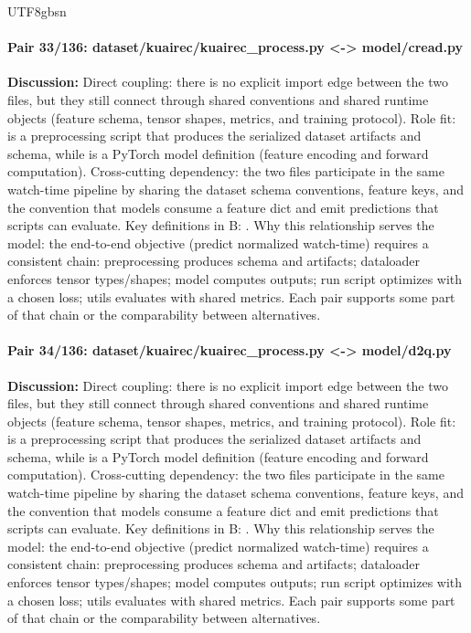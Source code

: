 \documentclass[11pt]{article}
\begin{document}
\begin{CJK*}{UTF8}{gbsn}
\paragraph{Pair 33/136: dataset/kuairec/kuairec\_process.py <-> model/cread.py}
\textbf{Discussion:} Direct coupling: there is no explicit import edge between the two files, but they still connect through shared conventions and shared runtime objects (feature schema, tensor shapes, metrics, and training protocol). Role fit: \texttt{} is a preprocessing script that produces the serialized dataset artifacts and schema, while \texttt{} is a PyTorch model definition (feature encoding and forward computation). Cross-cutting dependency: the two files participate in the same watch-time pipeline by sharing the dataset schema conventions, feature keys, and the convention that models consume a feature dict and emit predictions that scripts can evaluate. Key definitions in B: \texttt{}. Why this relationship serves the model: the end-to-end objective (predict normalized watch-time) requires a consistent chain: preprocessing produces schema and artifacts; dataloader enforces tensor types/shapes; model computes outputs; run script optimizes with a chosen loss; utils evaluates with shared metrics. Each pair supports some part of that chain or the comparability between alternatives.

\paragraph{Pair 34/136: dataset/kuairec/kuairec\_process.py <-> model/d2q.py}
\textbf{Discussion:} Direct coupling: there is no explicit import edge between the two files, but they still connect through shared conventions and shared runtime objects (feature schema, tensor shapes, metrics, and training protocol). Role fit: \texttt{} is a preprocessing script that produces the serialized dataset artifacts and schema, while \texttt{} is a PyTorch model definition (feature encoding and forward computation). Cross-cutting dependency: the two files participate in the same watch-time pipeline by sharing the dataset schema conventions, feature keys, and the convention that models consume a feature dict and emit predictions that scripts can evaluate. Key definitions in B: \texttt{}. Why this relationship serves the model: the end-to-end objective (predict normalized watch-time) requires a consistent chain: preprocessing produces schema and artifacts; dataloader enforces tensor types/shapes; model computes outputs; run script optimizes with a chosen loss; utils evaluates with shared metrics. Each pair supports some part of that chain or the comparability between alternatives.


\end{CJK*}
\end{document}

